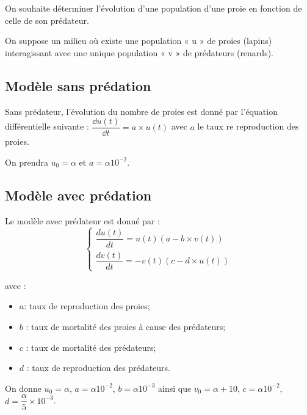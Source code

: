 \begin{obj}
On souhaite déterminer l’évolution d’une population d’une proie en fonction de celle de son prédateur.
\end{obj}

On suppose un milieu où existe une population « u » de proies (lapins) interagissant avec une unique population « v » de prédateurs (renards).

\subsection*{Modèle sans prédation}

Sans prédateur, l'évolution du nombre de proies est donné par l'équation différentielle suivante : $\dfrac{\dd u(t)}{\dd t} = a \times u(t)$ avec $a$ le taux re reproduction des proies. 

On prendra  $u_0 = \alpha$ et $a=\alpha 10^{-2}$. 



\subsection*{Modèle avec prédation}
Le modèle avec prédateur est donné par : 
$$
\left\{
\begin{array}{l}
\dfrac{du(t)}{dt}=u(t)\left(a - b\times v(t)\right)\\
\dfrac{dv(t)}{dt}=-v(t)\left(c - d\times u(t)\right)
\end{array}
\right.
$$

avec :
\begin{itemize}
\item $a $: taux de reproduction des proies;
\item $b$ : taux de mortalité des proies à cause des prédateurs;
\item $c$ : taux de mortalité des prédateurs;
\item $d$ : taux de reproduction des prédateurs.
\end{itemize}

On donne $u_0=\alpha$, $a=\alpha 10^{-2}$, $b=\alpha 10^{-3}$ ainsi que 
$v_0=\alpha+10$, $c=\alpha 10^{-2}$, $d=\dfrac{\alpha}{5} \times  10^{-3}$.




